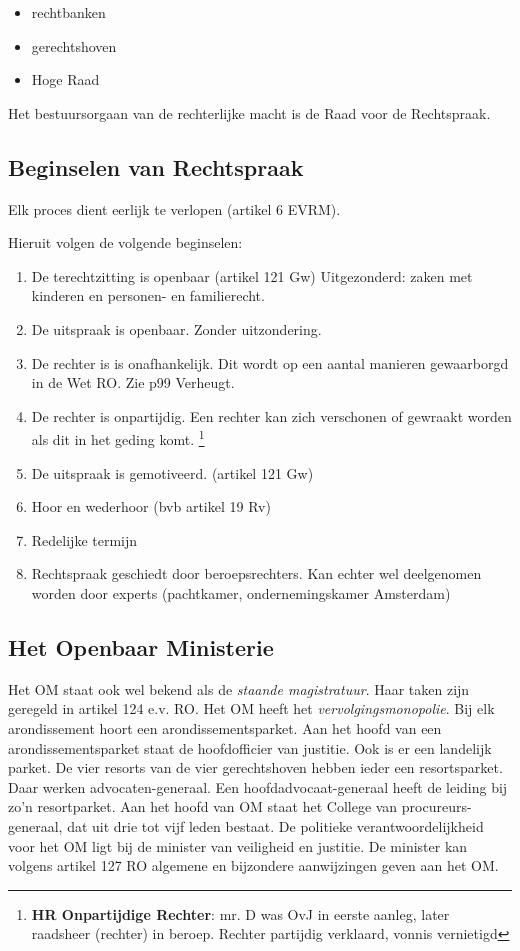 \documentclass{article}
\begin{document}
\begin{itemize}
  \item rechtbanken
  \item gerechtshoven
  \item Hoge Raad
\end{itemize}

Het bestuursorgaan van de rechterlijke macht is de Raad voor de Rechtspraak.

\subsection{Beginselen van Rechtspraak}
\label{beginselenrechtspraak}
Elk proces dient eerlijk te verlopen (artikel 6 EVRM).

Hieruit volgen de volgende beginselen:

\begin{enumerate}
  \item De terechtzitting is openbaar (artikel 121 Gw) Uitgezonderd: zaken met
    kinderen en personen- en familierecht.
  \item De uitspraak is openbaar. Zonder uitzondering.
  \item De rechter is is onafhankelijk. Dit wordt op een aantal manieren gewaarborgd
    in de Wet RO. Zie p99 Verheugt.
  \item De rechter is onpartijdig. Een rechter kan zich verschonen of gewraakt worden
    als dit in het geding komt. \footnote{\textbf{HR Onpartijdige Rechter}: mr. D was
    OvJ in eerste aanleg, later raadsheer (rechter) in beroep. Rechter partijdig verklaard,
    vonnis vernietigd}
  \item De uitspraak is gemotiveerd. (artikel 121 Gw)
  \item Hoor en wederhoor (bvb artikel 19 Rv)
  \item Redelijke termijn
  \item Rechtspraak geschiedt door beroepsrechters. Kan echter wel deelgenomen worden
    door experts (pachtkamer, ondernemingskamer Amsterdam)
\end{enumerate}

\subsection{Het Openbaar Ministerie}

Het OM staat ook wel bekend als de \emph{staande magistratuur}. Haar taken zijn
geregeld in artikel 124 e.v. RO. Het OM heeft het \emph{vervolgingsmonopolie}.
Bij elk arondissement hoort een arondissementsparket. Aan het hoofd van een
arondissementsparket staat de hoofdofficier van justitie. Ook is er een
landelijk parket. De vier resorts van de vier gerechtshoven hebben ieder een
resortsparket. Daar werken advocaten-generaal. Een hoofdadvocaat-generaal heeft
de leiding bij zo'n resortparket. Aan het hoofd van OM staat het College van
procureurs-generaal, dat uit drie tot vijf leden bestaat. De politieke
verantwoordelijkheid voor het OM ligt bij de minister van veiligheid en
justitie. De minister kan volgens artikel 127 RO algemene en bijzondere
aanwijzingen geven aan het OM.
\end{document}
